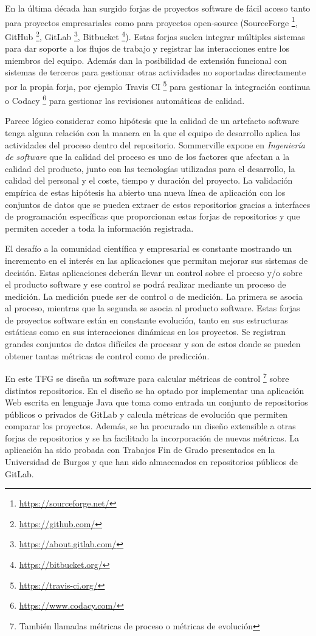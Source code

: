 En la última década han surgido forjas de proyectos software de fácil acceso tanto para proyectos empresariales como para proyectos open-source (SourceForge \footnote{\url{https://sourceforge.net/}}, GitHub \footnote{\url{https://github.com/}}, GitLab \footnote{\url{https://about.gitlab.com/}}, Bitbucket  \footnote{\url{https://bitbucket.org/}}).  Estas forjas suelen integrar múltiples sistemas para dar soporte a los flujos de trabajo y registrar las interacciones entre los miembros del equipo. Además dan la posibilidad de extensión funcional con sistemas de terceros para gestionar otras actividades no soportadas directamente por la propia forja, por ejemplo Travis CI \footnote{\url{https://travis-ci.org/}} para gestionar la integración continua o Codacy \footnote{\url{https://www.codacy.com/}} para gestionar las revisiones automáticas de calidad. 

Parece lógico considerar como hipótesis que la calidad de un artefacto software tenga alguna relación con la manera en la que el equipo de desarrollo aplica las actividades del proceso dentro del repositorio. Sommerville expone en \textit{Ingeniería de software} \citep{sommerville_ingenierisoftware_2002} que la calidad del proceso es uno de los factores que afectan a la calidad del producto, junto con las tecnologías utilizadas para el desarrollo, la calidad del personal y el coste, tiempo y duración del proyecto. La validación empírica de estas  hipótesis ha abierto una nueva línea de aplicación con los conjuntos de datos que se pueden extraer de estos repositorios gracias a interfaces de programación específicas que proporcionan estas forjas de repositorios y que permiten acceder a toda la información registrada.

El  desafío a la comunidad científica y empresarial es constante mostrando un incremento en el interés en las aplicaciones que permitan mejorar sus sistemas de decisión. Estas aplicaciones deberán llevar un control sobre el proceso y/o sobre el producto software y ese control se podrá realizar mediante un proceso de medición. La medición puede ser de control o de medición. La primera se asocia al proceso, mientras que la segunda se asocia al producto software. Estas forjas de proyectos software están en constante evolución, tanto en sus estructuras estáticas como en sus interacciones dinámicas en los proyectos. Se registran grandes conjuntos de datos difíciles de procesar y son de estos donde se pueden obtener tantas métricas de control como de predicción.

En este TFG se diseña un software para calcular métricas de control \footnote{También llamadas métricas de proceso o métricas de evolución} sobre distintos repositorios. En el diseño se ha optado por implementar una aplicación Web escrita en lenguaje Java que toma como entrada un conjunto de repositorios públicos o privados de GitLab y calcula métricas de evolución que permiten comparar los proyectos. Además, se ha procurado un diseño extensible a otras forjas de repositorios y se ha facilitado la incorporación de nuevas métricas. La aplicación ha sido probada con Trabajos Fin de Grado presentados en la Universidad de Burgos y que han sido almacenados en repositorios públicos de GitLab.

